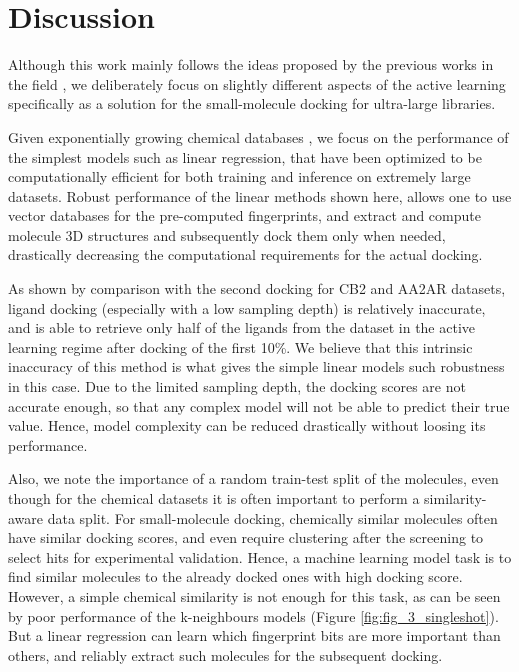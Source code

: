 \section{Discussion}

Although this work mainly follows the ideas proposed by the previous works in the field \cite{deepdocking, logistic_regression, Yang2021_shoichet_active_learning, Graff2021AcceleratingLearning}, we deliberately focus on slightly different aspects of the active learning specifically as a solution for the small-molecule docking for ultra-large libraries. 

Given exponentially growing chemical databases \cite{warr_exploration_2022, lyu_modeling_2023}, we focus on the performance of the simplest models such as linear regression, that have been optimized to be computationally efficient for both training and inference on extremely large datasets. Robust performance of the linear methods shown here, allows one to use vector databases \cite{noauthor_vector_nodate, noauthor_qdrant_nodate, johnson2019_faiss_vector_database} for the pre-computed fingerprints, and extract and compute molecule 3D structures and subsequently dock them only when needed, drastically decreasing the computational requirements for the actual docking.

As shown by comparison with the second docking for CB2 and AA2AR datasets, ligand docking (especially with a low sampling depth) is relatively inaccurate, and is able to retrieve only half of the ligands from the dataset in the active learning regime after docking of the first 10\%. We believe that this intrinsic inaccuracy of this method is what gives the simple linear models such robustness in this case. Due to the limited sampling depth, the docking scores are not accurate enough, so that any complex model will not be able to predict their true value. Hence, model complexity can be reduced drastically without loosing its performance.

Also, we note the importance of a random train-test split of the molecules, even though for the chemical datasets it is often important to perform a similarity-aware data split. For small-molecule docking, chemically similar molecules often have similar docking scores, and even require clustering after the screening to select hits for experimental validation. Hence, a machine learning model task is to find similar molecules to the already docked ones with high docking score. However, a simple chemical similarity is not enough for this task, as can be seen by poor performance of the k-neighbours models (Figure \ref{fig:fig_3_singleshot}). But a linear regression can learn which fingerprint bits are more important than others, and reliably extract such molecules for the subsequent docking. 

